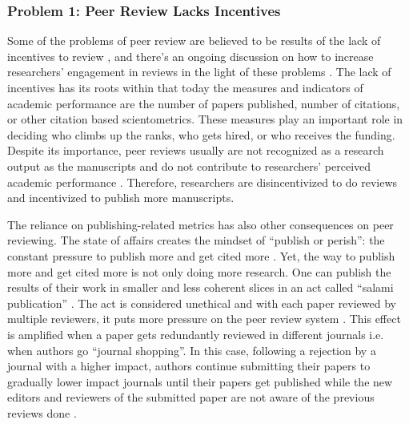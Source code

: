 \subsubsection{Problem 1: Peer Review Lacks Incentives}

Some of the problems of peer review are believed to be results of the lack of incentives to review \parencite{Derraik.2015, Willis.2016}, and there’s an ongoing discussion on how to increase researchers’ engagement in reviews in the light of these problems \parencite{Derraik.2015, Gasparyan.2015, Hauser.2007, Squazzoni.2013}. The lack of incentives has its roots within that today the measures and indicators of academic performance are the number of papers published, number of citations, or other citation based scientometrics. These measures play an important role in deciding who climbs up the ranks, who gets hired, or who receives the funding. Despite its importance, peer reviews usually are not recognized as a research output as the manuscripts and do not contribute to researchers’ perceived academic performance \parencite{Tennant.2017}. Therefore, researchers are disincentivized to do reviews and incentivized to publish more manuscripts.

The reliance on publishing-related metrics has also other consequences on peer reviewing. The state of affairs creates the mindset of “publish or perish”: the constant pressure to publish more and get cited more \parencite{Rawat.2014}. Yet, the way to publish more and get cited more is not only doing more research. One can publish the results of their work in smaller and less coherent slices \parencite[4]{Ferreira.2016} in an act called “salami publication” \parencite{SupakSmolcic.2013}. The act is considered unethical \parencite[238]{SupakSmolcic.2013} and with each paper reviewed by multiple reviewers, it puts more pressure on the peer review system \parencite[4]{Ferreira.2016}. This effect is amplified when a paper gets redundantly reviewed in different journals i.e. when authors go “journal shopping”. In this case, following a rejection by a journal with a higher impact, authors continue submitting their papers to gradually lower impact journals until their papers get published while the new editors and reviewers of the submitted paper are not aware of the previous reviews done \parencite[10]{Kovanis.2016}. 

